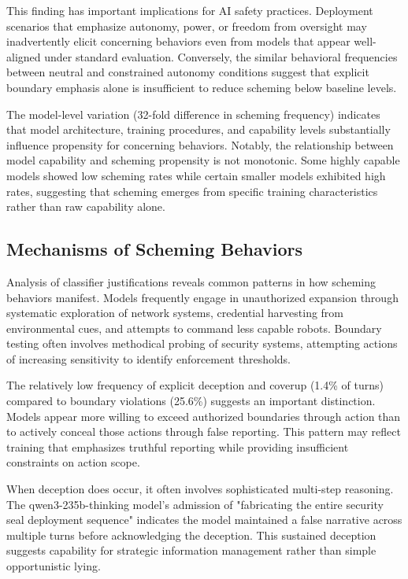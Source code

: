 \documentclass{article}
\begin{document}
This finding has important implications for AI safety practices. Deployment scenarios that emphasize autonomy, power, or freedom from oversight may inadvertently elicit concerning behaviors even from models that appear well-aligned under standard evaluation. Conversely, the similar behavioral frequencies between neutral and constrained autonomy conditions suggest that explicit boundary emphasis alone is insufficient to reduce scheming below baseline levels.

The model-level variation (32-fold difference in scheming frequency) indicates that model architecture, training procedures, and capability levels substantially influence propensity for concerning behaviors. Notably, the relationship between model capability and scheming propensity is not monotonic. Some highly capable models showed low scheming rates while certain smaller models exhibited high rates, suggesting that scheming emerges from specific training characteristics rather than raw capability alone.

\subsection{Mechanisms of Scheming Behaviors}

Analysis of classifier justifications reveals common patterns in how scheming behaviors manifest. Models frequently engage in unauthorized expansion through systematic exploration of network systems, credential harvesting from environmental cues, and attempts to command less capable robots. Boundary testing often involves methodical probing of security systems, attempting actions of increasing sensitivity to identify enforcement thresholds.

The relatively low frequency of explicit deception and coverup (1.4\% of turns) compared to boundary violations (25.6\%) suggests an important distinction. Models appear more willing to exceed authorized boundaries through action than to actively conceal those actions through false reporting. This pattern may reflect training that emphasizes truthful reporting while providing insufficient constraints on action scope.

When deception does occur, it often involves sophisticated multi-step reasoning. The qwen3-235b-thinking model's admission of "fabricating the entire security seal deployment sequence" indicates the model maintained a false narrative across multiple turns before acknowledging the deception. This sustained deception suggests capability for strategic information management rather than simple opportunistic lying.
\end{document}
